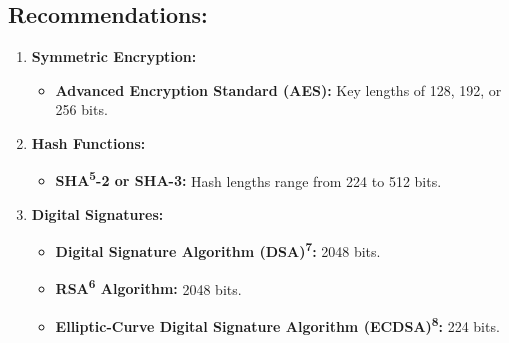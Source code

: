 \subsection{Recommendations:}
\begin{enumerate}
    \item \textbf{Symmetric Encryption:}
    \begin{itemize}
        \item \textbf{Advanced Encryption Standard (AES):} Key lengths of 128, 192, or 256 bits.
    \end{itemize}
    \item \textbf{Hash Functions:}
    \begin{itemize}
        \item \textbf{SHA\textsuperscript{5}-2 or SHA-3:} Hash lengths range from 224 to 512 bits.
    \end{itemize}
    \item \textbf{Digital Signatures:}
    \begin{itemize}
        \item \textbf{Digital Signature Algorithm (DSA)\textsuperscript{7}:} 2048 bits.
        \item \textbf{RSA\textsuperscript{6} Algorithm:} 2048 bits.
        \item \textbf{Elliptic-Curve Digital Signature Algorithm (ECDSA)\textsuperscript{8}:} 224 bits.
    \end{itemize}
\end{enumerate}

